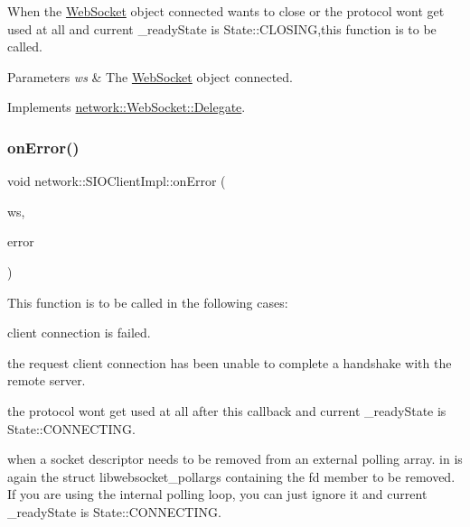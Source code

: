 When the \hyperlink{classnetwork_1_1WebSocket}{Web\+Socket} object connected wants to close or the protocol won\textquotesingle{}t get used at all and current \+\_\+ready\+State is State\+::\+C\+L\+O\+S\+I\+NG,this function is to be called.


\begin{DoxyParams}{Parameters}
{\em ws} & The \hyperlink{classnetwork_1_1WebSocket}{Web\+Socket} object connected. \\
\hline
\end{DoxyParams}


Implements \hyperlink{classnetwork_1_1WebSocket_1_1Delegate_a67305bda05963c9b54339bd784be7bc4}{network\+::\+Web\+Socket\+::\+Delegate}.

\mbox{\label{classnetwork_1_1SIOClientImpl_a903007575dfa680fc980fe11ac88b61e}} 
\subsubsection{\texorpdfstring{on\+Error()}{onError()}\hspace{0.1cm}{\footnotesize\ttfamily [1/2]}}
{\footnotesize\ttfamily void network\+::\+S\+I\+O\+Client\+Impl\+::on\+Error (\begin{DoxyParamCaption}\item[{\hyperlink{classnetwork_1_1WebSocket}{Web\+Socket} $\ast$}]{ws,  }\item[{const \hyperlink{classnetwork_1_1WebSocket_a33c111a23355ac485e3a56c9d0ab9a59}{Web\+Socket\+::\+Error\+Code} \&}]{error }\end{DoxyParamCaption})\hspace{0.3cm}{\ttfamily [virtual]}}

This function is to be called in the following cases\+:
\begin{DoxyEnumerate}
\item client connection is failed.
\item the request client connection has been unable to complete a handshake with the remote server.
\item the protocol won\textquotesingle{}t get used at all after this callback and current \+\_\+ready\+State is State\+::\+C\+O\+N\+N\+E\+C\+T\+I\+NG.
\item when a socket descriptor needs to be removed from an external polling array. in is again the struct libwebsocket\+\_\+pollargs containing the fd member to be removed. If you are using the internal polling loop, you can just ignore it and current \+\_\+ready\+State is State\+::\+C\+O\+N\+N\+E\+C\+T\+I\+NG.
\end{DoxyEnumerate}


